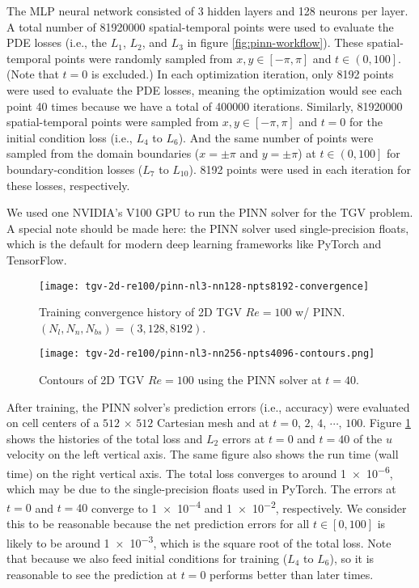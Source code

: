 The MLP neural network consisted of \num{3} hidden layers and \num{128} neurons per layer.
A total number of \num{81920000} spatial-temporal points were used to evaluate the PDE losses (i.e., the $L_1$, $L_2$, and $L_3$ in figure \ref{fig:pinn-workflow}).
These spatial-temporal points were randomly sampled from $x,y \in \left[-\pi, \pi\right]$ and $t \in \left(0, 100\right]$.
(Note that $t=0$ is excluded.)
In each optimization iteration, only \num{8192} points were used to evaluate the PDE losses, meaning the optimization would see each point \num{40} times because we have a total of \num{400000} iterations.
Similarly, \num{81920000} spatial-temporal points were sampled from $x,y \in \left[-\pi, \pi\right]$ and $t=0$ for the initial condition loss (i.e., $L_4$ to $L_6$).
And the same number of points were sampled from the domain boundaries ($x=\pm\pi$ and $y=\pm\pi$) at $t\in\left(0, 100\right]$ for boundary-condition losses ($L_7$ to $L_10$).
\num{8192} points were used in each iteration for these losses, respectively.

We used one NVIDIA's V100 GPU to run the PINN solver for the TGV problem.
A special note should be made here: the PINN solver used single-precision floats, which is the default for modern deep learning frameworks like PyTorch and TensorFlow.

\begin{figure}
    \centering%
    \texttt{[image: tgv-2d-re100/pinn-nl3-nn128-npts8192-convergence]}%
    \caption{%
        Training convergence history of 2D TGV $Re=\num{100}$ w/ PINN.
        $(N_l, N_n, N_{bs})=(3, 128, 8192)$.
    }
    \label{fig:tgv-pinn-loss}%
\end{figure}

\begin{figure}
    \centering%
    \texttt{[image: tgv-2d-re100/pinn-nl3-nn256-npts4096-contours.png]}
    \caption{%
        Contours of 2D TGV $Re=\num{100}$ using the PINN solver at $t=40$.
    }
    \label{fig:tgv-pinn-contours}%
\end{figure}

After training, the PINN solver's prediction errors (i.e., accuracy) were evaluated on cell centers of a $512$ $\times$ $512$ Cartesian mesh and at $t=0$, $2$, $4$, $\cdots$, $100$.
Figure \ref{fig:tgv-pinn-loss} shows the histories of the total loss and $L_2$ errors at $t=0$ and $t=40$ of the $u$ velocity on the left vertical axis.
The same figure also shows the run time (wall time) on the right vertical axis.
The total loss converges to around \num{1e-6}, which may be due to the single-precision floats used in PyTorch.
The errors at $t=0$ and $t=40$ converge to \num{1e-4} and \num{1e-2}, respectively.
We consider this to be reasonable because the net prediction errors for all $t\in[0, 100]$ is likely to be around \num{1e-3}, which is the square root of the total loss.
Note that because we also feed initial conditions for training ($L_4$ to $L_6$), so it is reasonable to see the prediction at $t=0$ performs better than later times.

